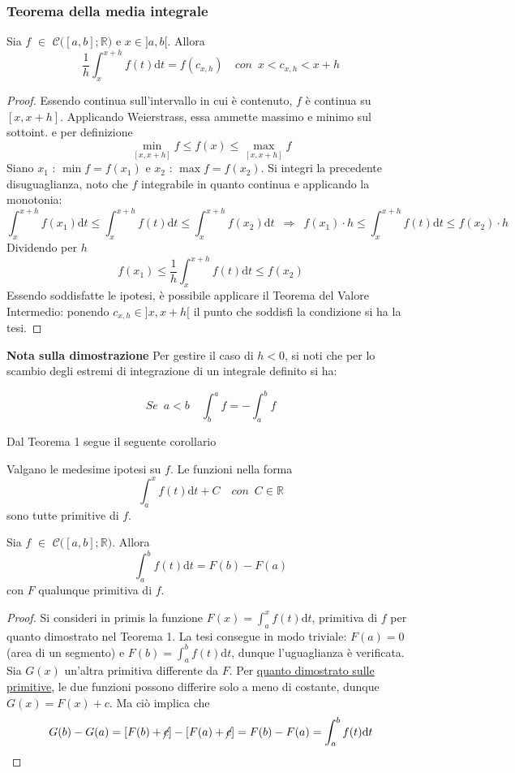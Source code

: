 \documentclass[10pt]{article}
\theoremstyle{plain}
\begin{document}
\subsubsection{Teorema della media integrale}
\begin{ther}[della m.i.]
    Sia $f$ $\in$ $\mathcal{C}\big([a,b] ; \mathbb{R}\big)$ e $x \in ]a,b[$. Allora
    \[\frac{1}{h}\int_x^{x+h}f(t)\textrm{d}t = f(c_{x,h}) \quad con \enspace x < c_{x,h} < x+h\]
\end{ther}
\begin{proof}
    Essendo continua sull'intervallo in cui è contenuto, $f$ è continua su $[x, x+h]$. Applicando Weierstrass, essa ammette massimo e minimo sul sottoint. e per definizione
    \[\min\limits_{[x, x+h]} f \leq f(x) \leq \max\limits_{[x, x+h]} f\]
    Siano $x_1$ : $\min f = f(x_1)$ e $x_2$ : $\max f = f(x_2)$. Si integri la precedente disuguaglianza, noto che $f$ integrabile in quanto continua e applicando la monotonia:
    \[\int_x^{x+h} f(x_1)\textrm{d}t\leq \int_x^{x+h} f(t)\textrm{d}t \leq \int_x^{x+h} f(x_2)\textrm{d}t \enspace \Rightarrow \enspace f(x_1) \cdot h \leq \int_x^{x+h} f(t)\textrm{d}t \leq f(x_2) \cdot h\]
    Dividendo per $h$
    \[f(x_1) \leq \frac{1}{h} \int_x^{x+h} f(t)\textrm{d}t \leq f(x_2)\]
    Essendo soddisfatte le ipotesi, è possibile applicare il Teorema del Valore Intermedio: ponendo $c_{x,h} \in ]x, x+h[$ il punto che soddisfi la condizione si ha la tesi.
\end{proof}
\textbf{Nota sulla dimostrazione} Per gestire il caso di $h < 0$, si noti che per lo scambio degli estremi di integrazione di un integrale definito si ha:

\begin{oss}
    \[Se \enspace a < b \quad \int_b^a f = - \int_a^b f\]
\end{oss}

Dal Teorema 1 segue il seguente corollario
\begin{cor}
    Valgano le medesime ipotesi su $f$. Le funzioni nella forma 
    \[\int_a^x f(t)\textrm{d}t + C \quad con \enspace C \in \mathbb{R}\]
    sono tutte primitive di $f$.
\end{cor}

\begin{ther}
    Sia $f$ $\in$ $\mathcal{C}\big([a,b] ; \mathbb{R}\big)$. Allora
    \[\int_a^b f(t)\textrm{d}t = F(b) - F(a)\]
    con $F$ qualunque primitiva di $f$.
\end{ther}
\begin{proof}
    Si consideri in primis la funzione $F(x) = \int_a^x f(t)\textrm{d}t$, primitiva di $f$ per quanto dimostrato nel Teorema 1. La tesi consegue in modo triviale: $F(a) = 0$ (area di un segmento) e $F(b) = \int_a^b f(t)\textrm{d}t$, dunque l'uguaglianza è verificata.
    \\Sia $G(x)$ un'altra primitiva differente da $F$. Per \hyperlink{primitive}{quanto dimostrato sulle primitive}, le due funzioni possono differire solo a meno di costante, dunque $G(x) = F(x) + c$. Ma ciò implica che
    \[G(b) - G(a) = [F(b) + \cancel{c}] - [F(a) + \cancel{c}] = F(b) - F(a) = \int_a^b f(t)\textrm{d}t\]
\end{proof}
\end{document}
